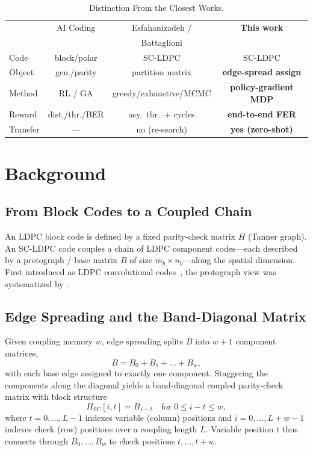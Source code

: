 \documentclass[journal]{IEEEtran}
\begin{document}
\begin{table}[t]
\centering
\caption{Distinction From the Closest Works.}
\label{tab:distinction}
\renewcommand{\arraystretch}{1.2}
\setlength{\tabcolsep}{3pt}
\footnotesize
\begin{tabular}{@{}lccc@{}}
\toprule
 & AI Coding & Esfahanizadeh / & \textbf{This work}\\
 & \cite{huang2020aicoding} & Battaglioni & \\
\midrule
Code      & block/polar    & SC-LDPC                 & SC-LDPC\\
Object    & gen./parity    & partition matrix        & \textbf{edge-spread assign}\\
Method    & RL / GA        & greedy/exhaustive/MCMC  & \textbf{policy-gradient MDP}\\
Reward    & dist./thr./BER & asy.\ thr.\ + cycles    & \textbf{end-to-end FER}\\
Transfer  & ---            & no (re-search)          & \textbf{yes (zero-shot)}\\
\bottomrule
\end{tabular}
\end{table}

\section{Background}\label{sec:background}
\subsection{From Block Codes to a Coupled Chain}
An LDPC block code is defined by a fixed parity-check matrix $H$ (Tanner graph).
An SC-LDPC code couples a chain of LDPC component codes---each described by a
protograph / base matrix $B$ of size $m_b \times n_b$---along the spatial
dimension. First introduced as LDPC convolutional
codes~\cite{felstrom1999ldpcc}, the protograph view was systematized
by~\cite{kudekar2011threshold}.

\subsection{Edge Spreading and the Band-Diagonal Matrix}
Given coupling memory $w$, edge spreading splits $B$ into $w{+}1$ component
matrices,
\begin{equation}
B = B_0 + B_1 + \dots + B_w,
\end{equation}
with each base edge assigned to exactly one component. Staggering the components
along the diagonal yields a band-diagonal coupled parity-check matrix with block
structure
\begin{equation}
H_{\mathrm{SC}}[i,t] = B_{\,i-t}\quad\text{for } 0 \le i-t \le w,
\end{equation}
where $t = 0,\dots,L{-}1$ indexes variable (column) positions and
$i = 0,\dots,L{+}w{-}1$ indexes check (row) positions over a coupling length
$L$. Variable position $t$ thus connects through $B_0,\dots,B_w$ to check
positions $t,\dots,t{+}w$.
\end{document}
